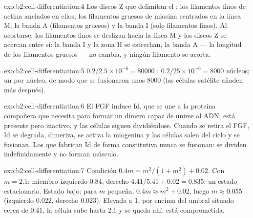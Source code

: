 \begin{solution}{exo:b2:cell-differentiation:4}
Los discos Z que delimitan el ; los filamentos finos de actina
anclados en ellos; los filamentos gruesos de miosina centrados en la línea
M; la banda A (filamentos gruesos) y la banda I (solo filamentos finos).
Al acortarse, los filamentos finos se deslizan hacia la línea M y los
discos Z se acercan entre sí: la banda I y la zona H se estrechan, la
banda A --- la longitud de los filamentos gruesos --- no cambia, y ningún
filamento se acorta.
\end{solution}

\begin{solution}{exo:b2:cell-differentiation:5}
$0.2/2.5\times 10^{-6} = \num{80000}$ ; $0.2/25\times 10^{-6}
= \num{8000}$ núcleos; un  por núcleo, de modo que se fusionaron
unos \num{8000}  (las células satélite añaden más después).
\end{solution}

\begin{solution}{exo:b2:cell-differentiation:6}
El FGF induce Id, que se une a la proteína compañera que  necesita
para formar un dímero capaz de unirse al ADN;  está presente pero
inactivo, y las células siguen dividiéndose. Cuando se retira el FGF, Id
se degrada,  dimeriza, se activa la miogenina y las células salen del
ciclo y se fusionan. Los  que fabrican Id de forma constitutiva
nunca se fusionan: se dividen indefinidamente y no forman músculo.
\end{solution}

\begin{solution}{exo:b2:cell-differentiation:7}
Condición $0.4m = m^{2}/(1 + m^{2}) + 0.02$. Con $m = 2.1$: miembro
izquierdo $0.84$, derecho $4.41/5.41 + 0.02 = 0.835$: un estado
estacionario. Estado bajo: para $m$ pequeña, $0.4m \approx m^{2} + 0.02$,
luego $m \approx
0.055$ (izquierdo $0.022$, derecho $0.023$). Elevada a 1, por encima del
umbral situado cerca de $0.41$, la célula sube hasta $2.1$ y se queda ahí:
está comprometida.
\end{solution}

